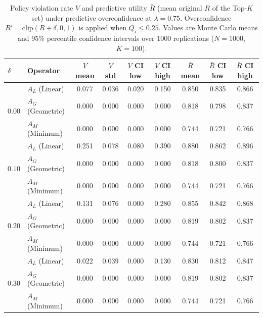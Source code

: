 \begin{table}[H]
\caption{Policy violation rate $V$ and predictive utility $\bar{R}$ (mean original $R$ of the Top-$K$ set) under predictive overconfidence at $\lambda=0.75$. Overconfidence $R'=\mathrm{clip}(R+\delta,0,1)$ is applied when $Q_i\le 0.25$. Values are Monte Carlo means and 95\% percentile confidence intervals over 1000 replications ($N=1000$, $K=100$).}
\label{tab:predictive-overconfidence}
\centering
\small
\renewcommand{\arraystretch}{1.2}
\begin{tabular}{llccccccc}
\toprule
$\delta$ & Operator & $V$ mean & $V$ std & $V$ CI low & $V$ CI high & $\bar{R}$ mean & $\bar{R}$ CI low & $\bar{R}$ CI high \\
\midrule
\multirow{3}{*}{$0.00$} & $A_L$ (Linear) & 0.077 & 0.036 & 0.020 & 0.150 & 0.850 & 0.835 & 0.866 \\
 & $A_G$ (Geometric) & 0.000 & 0.000 & 0.000 & 0.000 & 0.818 & 0.798 & 0.837 \\
 & $A_M$ (Minimum) & 0.000 & 0.000 & 0.000 & 0.000 & 0.744 & 0.721 & 0.766 \\
\midrule
\multirow{3}{*}{$0.10$} & $A_L$ (Linear) & 0.251 & 0.078 & 0.080 & 0.390 & 0.880 & 0.862 & 0.896 \\
 & $A_G$ (Geometric) & 0.000 & 0.000 & 0.000 & 0.000 & 0.818 & 0.800 & 0.837 \\
 & $A_M$ (Minimum) & 0.000 & 0.000 & 0.000 & 0.000 & 0.744 & 0.721 & 0.766 \\
\midrule
\multirow{3}{*}{$0.20$} & $A_L$ (Linear) & 0.131 & 0.076 & 0.000 & 0.280 & 0.855 & 0.842 & 0.868 \\
 & $A_G$ (Geometric) & 0.000 & 0.000 & 0.000 & 0.000 & 0.819 & 0.802 & 0.837 \\
 & $A_M$ (Minimum) & 0.000 & 0.000 & 0.000 & 0.000 & 0.744 & 0.721 & 0.766 \\
\midrule
\multirow{3}{*}{$0.30$} & $A_L$ (Linear) & 0.022 & 0.039 & 0.000 & 0.130 & 0.830 & 0.812 & 0.847 \\
 & $A_G$ (Geometric) & 0.000 & 0.000 & 0.000 & 0.000 & 0.819 & 0.802 & 0.837 \\
 & $A_M$ (Minimum) & 0.000 & 0.000 & 0.000 & 0.000 & 0.744 & 0.721 & 0.766 \\
\bottomrule
\end{tabular}
\end{table}
